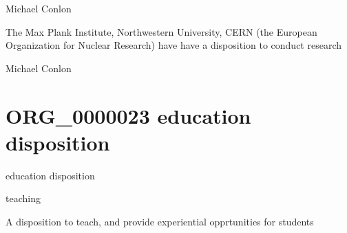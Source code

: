 \documentclass[letterpaper,10pt,english]{sphinxmanual}
\begin{document}
\begin{sphinxShadowBox}

\sphinxAtStartPar
Michael Conlon 
\end{sphinxShadowBox}

\begin{sphinxShadowBox}

\sphinxAtStartPar
The Max Plank Institute, Northwestern University, CERN (the European Organization for Nuclear Research) have have a disposition to conduct research
\end{sphinxShadowBox}

\begin{sphinxShadowBox}

\sphinxAtStartPar
Michael Conlon 
\end{sphinxShadowBox}
\begin{quote}
\label{\detokenize{doc-ORG_0000023:org-0000023}}\label{\detokenize{doc-ORG_0000023:education-disposition}}\label{\detokenize{doc-ORG_0000023:org-0000023}}
\ignorespaces \end{quote}


\section{ORG\_0000023 \sphinxhyphen{} education disposition}
\label{\detokenize{doc-ORG_0000023:org-0000023-education-disposition}}\label{\detokenize{doc-ORG_0000023:index-0}}\label{\detokenize{doc-ORG_0000023::doc}}
\begin{sphinxShadowBox}

\sphinxAtStartPar
education disposition
\end{sphinxShadowBox}

\begin{sphinxShadowBox}

\sphinxAtStartPar
teaching
\end{sphinxShadowBox}

\begin{sphinxShadowBox}

\sphinxAtStartPar
A disposition to teach, and provide experiential opprtunities for students
\end{sphinxShadowBox}
\end{document}
